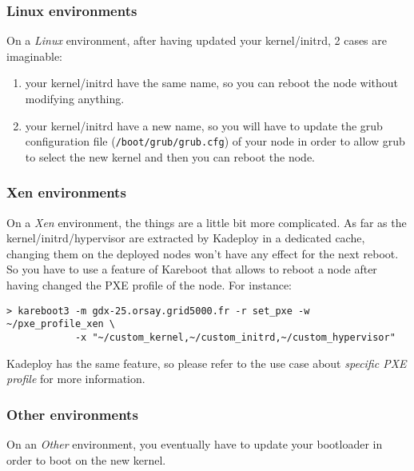 \documentclass[a4wide,10pt,oneside]{book}
\begin{document}
\subsubsection{Linux environments}
On a \emph{Linux} environment, after having updated your kernel/initrd, 2 cases are imaginable:
\begin{enumerate}
\item your kernel/initrd have the same name, so you can reboot the node without modifying anything.
\item your kernel/initrd have a new name, so you will have to update the grub configuration file (\texttt{/boot/grub/grub.cfg}) of your node in order to allow grub to select the new kernel and then you can reboot the node.
\end{enumerate}

\subsubsection{Xen environments}
On a \emph{Xen} environment, the things are a little bit more complicated. As far as the kernel/initrd/hypervisor are extracted by Kadeploy in a dedicated cache, changing them on the deployed nodes won't have any effect for the next reboot. So you have to use a feature of Kareboot that allows to reboot a node after having changed the PXE profile of the node. For instance:
\begin{verbatim}
> kareboot3 -m gdx-25.orsay.grid5000.fr -r set_pxe -w ~/pxe_profile_xen \
            -x "~/custom_kernel,~/custom_initrd,~/custom_hypervisor"
\end{verbatim}
Kadeploy has the same feature, so please refer to the use case about \textit{specific PXE profile} for more information.

\subsubsection{Other environments}
On an \emph{Other} environment, you eventually have to update your bootloader in order to boot on the new kernel.
\end{document}
